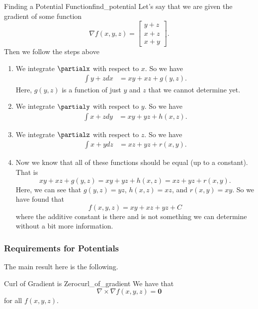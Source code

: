         \begin{ex}{Finding a Potential Function}{find_potential}
        Let's say that we are given the gradient of some function
        \[
        \nabla f(x,y,z) = \begin{bmatrix} y+z \\ x+z \\ x+y \end{bmatrix}.
        \]
        Then we follow the steps above
        \begin{enumerate}[1.]
            \item We integrate $\partialx$ with respect to $x$.  So we have
            \begin{align*}
                \int y+z dx &= xy+xz + g(y,z).
            \end{align*}
            Here, $g(y,z)$ is a function of just $y$ and $z$ that we cannot determine yet.
            \item We integrate $\partialy$ with respect to $y$. So we have
            \begin{align*}
                \int x+z dy &= xy+yz + h(x,z).
            \end{align*}
            \item We integrate $\partialz$ with respect to $z$. So we have
            \begin{align*}
                \int x+y dz &= xz+yz + r(x,y).
            \end{align*}
            \item Now we know that all of these functions should be equal (up to a constant).  That is
            \[
            xy+xz+g(y,z)=xy+yz+h(x,z)=xz+yz+r(x,y).
            \]
            Here, we can see that $g(y,z)=yz$, $h(x,z)=xz$, and $r(x,y)=xy$.  So we have found that 
            \[
            f(x,y,z) = xy + xz + yz + C
            \]
            where the additive constant is there and is not something we can determine without a bit more information.
        \end{enumerate}
        \end{ex}
        
        \subsubsection{Requirements for Potentials}
        
        The main result here is the following.
        
        \begin{prop}{Curl of Gradient is Zero}{curl_of_gradient}
        We have that
        \[
        \nabla \times \nabla f(x,y,z) = \mathbf{0}
        \]
        for all $f(x,y,z)$.
        \end{prop}
        
